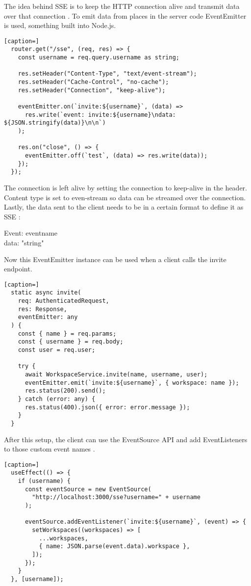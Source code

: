 The idea behind SSE is to keep the HTTP connection alive and transmit data over that connection \cite{w3-sse}. To emit data from places in the server code EventEmitter is used, something built into Node.js.

\begin{lstlisting}[caption=]
  router.get("/sse", (req, res) => {
    const username = req.query.username as string;
   
    res.setHeader("Content-Type", "text/event-stream");
    res.setHeader("Cache-Control", "no-cache");
    res.setHeader("Connection", "keep-alive");
   
    eventEmitter.on(`invite:${username}`, (data) =>
      res.write(`event: invite:${username}\ndata: ${JSON.stringify(data)}\n\n`)
    );
   
    res.on("close", () => {
      eventEmitter.off(`test`, (data) => res.write(data));
    });
  });
\end{lstlisting}

The connection is left alive by setting the connection to keep-alive in the header. Content type is set to even-stream so data can be streamed over the connection. Lastly, the data sent to the client needs to be in a certain format to define it as SSE \cite{html-spec-sse}:

Event: eventname\\
data: "string"

Now this EventEmitter instance can be used when a client calls the invite endpoint.

\begin{lstlisting}[caption=]
  static async invite(
    req: AuthenticatedRequest,
    res: Response,
    eventEmitter: any
  ) {
    const { name } = req.params;
    const { username } = req.body;
    const user = req.user;
 
    try {
      await WorkspaceService.invite(name, username, user);
      eventEmitter.emit(`invite:${username}`, { workspace: name });
      res.status(200).send();
    } catch (error: any) {
      res.status(400).json({ error: error.message });
    }
  }
\end{lstlisting}

After this setup, the client can use the EventSource API and add EventListeners to those custom event names \cite{w3-sse}.

\begin{lstlisting}[caption=]
  useEffect(() => {
    if (username) {
      const eventSource = new EventSource(
        "http://localhost:3000/sse?username=" + username
      );
 
      eventSource.addEventListener(`invite:${username}`, (event) => {
        setWorkspaces((workspaces) => [
          ...workspaces,
          { name: JSON.parse(event.data).workspace },
        ]);
      });
    }
  }, [username]);
\end{lstlisting}

